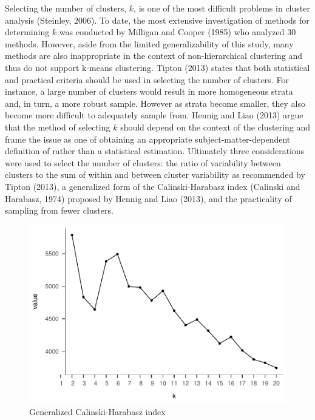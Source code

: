 \documentclass[man,floatsintext]{apa6}
\theoremstyle{definition}
\theoremstyle{definition}
\theoremstyle{definition}
\theoremstyle{remark}
\begin{document}
Selecting the number of clusters, \(k\), is one of the most difficult
problems in cluster analysis (Steinley, 2006). To date, the most
extensive investigation of methods for determining \(k\) was conducted
by Milligan and Cooper (1985) who analyzed 30 methods. However, aside
from the limited generalizability of this study, many methods are also
inappropriate in the context of non-hierarchical clustering and thus do
not support k-means clustering. Tipton (2013) states that both
statistical and practical criteria should be used in selecting the
number of clusters. For instance, a large number of clusters would
result in more homogeneous strata and, in turn, a more robust sample.
However as strata become smaller, they also become more difficult to
adequately sample from. Hennig and Liao (2013) argue that the method of
selecting \(k\) should depend on the context of the clustering and frame
the issue as one of obtaining an appropriate subject-matter-dependent
definition of rather than a statistical estimation. Ultimately three
considerations were used to select the number of clusters: the ratio of
variability between clusters to the sum of within and between cluster
variability as recommended by Tipton (2013), a generalized form of the
Calinski-Harabasz index (Calinski and Harabasz, 1974) proposed by Hennig
and Liao (2013), and the practicality of sampling from fewer clusters.

\begin{figure}
\centering
\includegraphics{GenSamp_Paper_files/figure-latex/fig-ch-1.pdf}
\caption{\label{fig:fig-ch}Generalized Calinski-Harabasz index}
\end{figure}
\end{document}
